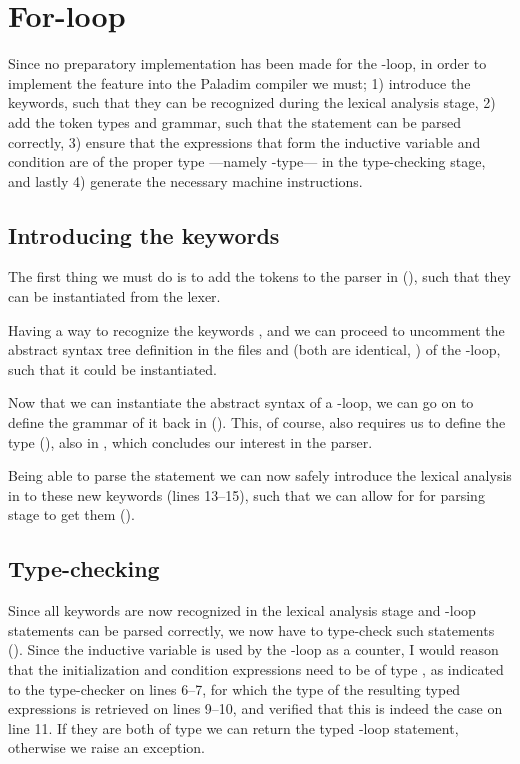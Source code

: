 %
%
%

\section{For-loop}
Since no preparatory implementation has been made for the -loop, in
order to implement the feature into the Paladim compiler we must; 1) introduce
the keywords, such that they can be recognized during the lexical analysis
stage, 2) add the token types and grammar, such that the statement can be
parsed correctly, 3) ensure that the expressions that form the inductive
variable and condition are of the proper type ---namely -type--- in
the type-checking stage, and lastly 4) generate the necessary machine
instructions.

\subsection{Introducing the keywords}
The first thing we must do is to add the tokens to the parser in
 (), such
that they can be instantiated from the lexer.

Having a way to recognize the keywords ,  and 
we can proceed to uncomment the abstract syntax tree definition in the files
 and  (both are identical,
) of the -loop, such
that it could be instantiated.

Now that we can instantiate the abstract syntax of a -loop, we can
go on to define the grammar of it back in 
(). This, of course, also
requires us to define the  type
(), also in
, which concludes our interest in the parser.

Being able to parse the statement we can now safely introduce the lexical
analysis in  to these new keywords (lines 13--15), such that
we can allow for for parsing stage to get them
().

\subsection{Type-checking}
Since all keywords are now recognized in the lexical analysis stage and
-loop statements can be parsed correctly, we now have to type-check
such statements (). Since the
inductive variable is used by the -loop as a counter, I would reason
that the initialization and condition expressions need to be of type
, as indicated to the type-checker on lines 6--7, for which the
type of the resulting typed expressions is retrieved on lines 9--10, and
verified that this is indeed the case on line 11. If they are both of type
 we can return the typed -loop statement, otherwise we
raise an exception.

